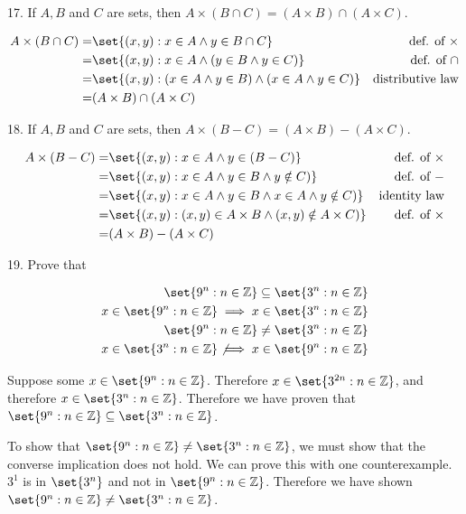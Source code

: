 \documentclass{hippoidC}
\begin{document}
\begin{prooflist}{17. If $A, B$ and $C$ are sets, then $A \times(B \cap C)=(A \times B) \cap(A \times C)$.}
\item
\begin{align*}
    A\times (B\cap C) =& \set{(x, y): x\in A \land y\in B\cap C} & \text{def. of }\times\\
    =& \set{(x,y): x\in A \land (y \in B \land y\in C)} & \text{def. of $\cap$}\\
    =& \set{(x,y): (x\in A \land y \in B) \land (x\in A \land y\in C)} &
    \text{distributive law}\\
    =& (A\times B) \cap (A\times C)
\end{align*}
\end{prooflist}

\begin{prooflist}{18. If $A, B$ and $C$ are sets, then $A \times(B-C)=(A \times B)-(A \times C)$.}
\item
\begin{align*}
    A\times (B-C) =& \set{(x, y): x\in A \land y\in (B-C)} & \text{def. of }\times\\
    =& \set{(x,y): x\in A \land y \in B \land y\notin C)} & \text{def. of }-\\
    =& \set{(x,y): x\in A \land y \in B \land x\in A \land y\notin C)} & \text{identity law}\\
    =& \set{(x,y): (x, y) \in A\times B \land (x, y) \notin A \times C)} &
    \text{def. of }\times\\
    =& (A\times B) - (A\times C)
\end{align*}
\end{prooflist}

\begin{prooflist}{19. Prove that}
\item
\begin{align*}
\set{9^n: n \in \mathbb{Z}} \subseteq\set{3^n: n \in \mathbb{Z}}\\
x\in \set{9^n: n \in \mathbb{Z}} \implies x\in\set{3^n: n \in \mathbb{Z}}\\
\set{9^n: n \in \mathbb{Z}} \neq\set{3^n: n \in \mathbb{Z}}\\
x\in\set{3^n: n \in \mathbb{Z}}
\not\implies
x\in \set{9^n: n \in \mathbb{Z}}
\end{align*}
\item Suppose some $x\in \set{9^n: n\in\mathbb{Z}}$. Therefore $x\in\set{3^{2n}:
    n\in\mathbb{Z}}$, and therefore $x\in\set{3^n: n\in\mathbb{Z}}$. Therefore
    we have proven that $\set{9^n: n \in \mathbb{Z}} \subseteq\set{3^n: n \in \mathbb{Z}}$.
\item To show that $\set{9^n: n \in \mathbb{Z}} \neq\set{3^n: n \in
    \mathbb{Z}}$, we must show that the converse implication does not hold. We
    can prove this with one counterexample. $3^1$ is in $\set{3^n}$ and not in
    $\set{9^n:n\in\mathbb{Z}}$. Therefore we have shown
$\set{9^n: n \in \mathbb{Z}} \neq\set{3^n: n \in \mathbb{Z}}$.
\end{prooflist}
\end{document}
